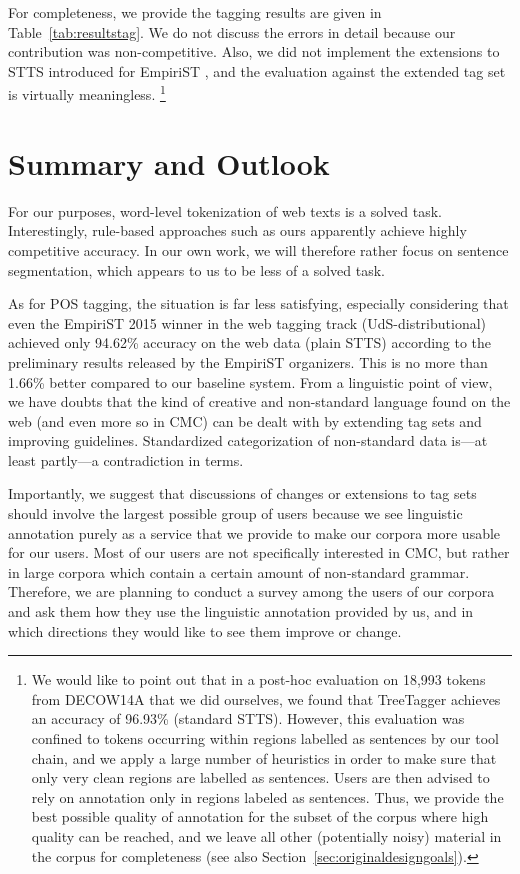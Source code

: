 \documentclass[11pt]{article}
\begin{document}
For completeness, we provide the tagging results are given in Table~\ref{tab:resultstag}.
We do not discuss the errors in detail because our contribution was non-competitive.
Also, we did not implement the extensions to STTS introduced for EmpiriST \cite{BeisswengerEa2016}, and the evaluation against the extended tag set is virtually meaningless.%
\footnote{
We would like to point out that in a post-hoc evaluation on 18,993 tokens from DECOW14A that we did ourselves, we found that TreeTagger achieves an accuracy of 96.93\% (standard STTS).
However, this evaluation was confined to tokens occurring within regions labelled as sentences by our tool chain, and we apply a large number of heuristics in order to make sure that only very clean regions are labelled as sentences.
Users are then advised to rely on annotation only in regions labeled as sentences.
Thus, we provide the best possible quality of annotation for the subset of the corpus where high quality can be reached, and we leave all other (potentially noisy) material in the corpus for completeness (see also Section~\ref{sec:originaldesigngoals}).
}

\section{Summary and Outlook}
\label{sec:summaryoutlook}

For our purposes, word-level tokenization of web texts is a solved task.
Interestingly, rule-based approaches such as ours apparently achieve highly competitive accuracy.
In our own work, we will therefore rather focus on sentence segmentation, which appears to us to be less of a solved task.

As for POS tagging, the situation is far less satisfying, especially considering that even the EmpiriST 2015 winner in the web tagging track (UdS-distributional) achieved only 94.62\% accuracy on the web data (plain STTS) according to the preliminary results released by the EmpiriST organizers.
This is no more than 1.66\% better compared to our baseline system.
From a linguistic point of view, we have doubts that the kind of creative and non-standard language found on the web (and even more so in CMC) can be dealt with by extending tag sets and improving guidelines.
Standardized categorization of non-standard data is---at least partly---a contradiction in terms.

Importantly, we suggest that discussions of changes or extensions to tag sets should involve the largest possible group of users because we see linguistic annotation purely as a service that we provide to make our corpora more usable for our users.
Most of our users are not specifically interested in CMC, but rather in large corpora which contain a certain amount of non-standard grammar.
Therefore, we are planning to conduct a survey among the users of our corpora and ask them how they use the linguistic annotation provided by us, and in which directions they would like to see them improve or change.
\end{document}
